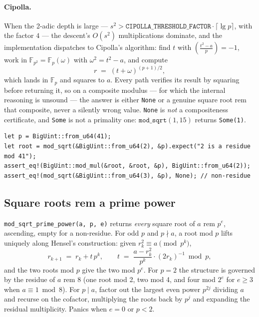 \documentclass[11pt]{article}
\newcommand{\code}[1]{\texttt{#1}}
\newcommand{\F}{\mathbb{F}}
\newcommand{\jac}[2]{\left(\frac{#1}{#2}\right)}
\begin{document}
\paragraph{Cipolla.} When the 2-adic depth is large --- $s^2 >
\code{CIPOLLA\_THRESHOLD\_FACTOR} \cdot \lceil \lg p \rceil$, with the factor
$4$ --- the descent's $O(s^2)$ multiplications dominate, and the
implementation dispatches to Cipolla's algorithm: find $t$ with $\jac{t^2 - a}{p} = -1$, work in
$\F_{p^2} = \F_p(\omega)$ with $\omega^2 = t^2 - a$, and compute
\begin{equation}
r \;=\; (t + \omega)^{(p+1)/2},
\end{equation}
which lands in $\F_p$ and squares to $a$. Every path verifies its result
by squaring before returning it, so on a composite modulus --- for which
the internal reasoning is unsound --- the answer is either \code{None} or
a genuine square root rem that composite, never a silently wrong value.
\code{None} is \emph{not} a compositeness certificate, and \code{Some} is
not a primality one: $\code{mod\_sqrt}(1, 15)$ returns \code{Some(1)}.

\begin{lstlisting}
let p = BigUint::from_u64(41);
let root = mod_sqrt(&BigUint::from_u64(2), &p).expect("2 is a residue mod 41");
assert_eq!(BigUint::mod_mul(&root, &root, &p), BigUint::from_u64(2));
assert_eq!(mod_sqrt(&BigUint::from_u64(3), &p), None); // non-residue
\end{lstlisting}

\subsection{Square roots rem a prime power}

\code{mod\_sqrt\_prime\_power(a, p, e)} returns \emph{every} square root of
$a$ rem $p^e$, ascending, empty for a non-residue. For odd $p$ and
$p \nmid a$, a root mod $p$ lifts uniquely along Hensel's construction:
given $r_k^2 \equiv a \pmod{p^k}$,
\begin{equation}
r_{k+1} \;=\; r_k + t\,p^k,
\qquad
t \;=\; \frac{a - r_k^2}{p^k} \cdot (2 r_k)^{-1} \bmod p,
\end{equation}
and the two roots mod $p$ give the two mod $p^e$. For $p = 2$ the
structure is governed by the residue of $a$ rem 8 (one root mod 2, two
mod 4, and four mod $2^e$ for $e \ge 3$ when $a \equiv 1 \bmod 8$). For
$p \mid a$, factor out the largest even power $p^{2j}$ dividing $a$ and
recurse on the cofactor, multiplying the roots back by $p^j$ and expanding
the residual multiplicity. Panics when $e = 0$ or $p < 2$.
\end{document}
